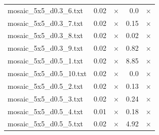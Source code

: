 \documentclass{article}
\begin{document}
\begin{center}
\begin{tabular}{lrrrr}
mosaic\_5x5\_d0.3\_6.txt & 0.02 & 
$\times$
 & 0.0 & 
$\times$
\\
mosaic\_5x5\_d0.3\_7.txt & 0.02 & 
$\times$
 & 0.15 & 
$\times$
\\
mosaic\_5x5\_d0.3\_8.txt & 0.02 & 
$\times$
 & 0.02 & 
$\times$
\\
mosaic\_5x5\_d0.3\_9.txt & 0.02 & 
$\times$
 & 0.82 & 
$\times$
\\
mosaic\_5x5\_d0.5\_1.txt & 0.02 & 
$\times$
 & 8.85 & 
$\times$
\\
mosaic\_5x5\_d0.5\_10.txt & 0.02 & 
$\times$
 & 0.0 & 
$\times$
\\
mosaic\_5x5\_d0.5\_2.txt & 0.02 & 
$\times$
 & 0.13 & 
$\times$
\\
mosaic\_5x5\_d0.5\_3.txt & 0.02 & 
$\times$
 & 0.24 & 
$\times$
\\
mosaic\_5x5\_d0.5\_4.txt & 0.01 & 
$\times$
 & 0.18 & 
$\times$
\\
mosaic\_5x5\_d0.5\_5.txt & 0.02 & 
$\times$
 & 4.92 & 
$\times$
\\
\hline\end{tabular}
\end{center}
\end{document}
